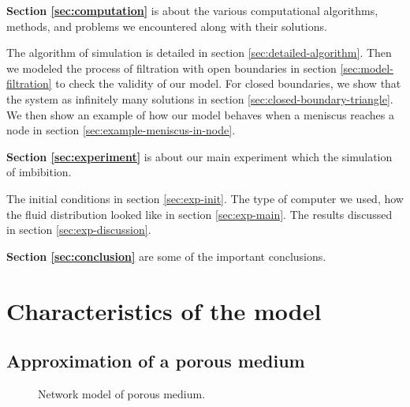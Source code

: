 \documentclass{crm-article}
\begin{document}
			\textbf{Section \ref{sec:computation}} is about the various computational algorithms, methods, and problems we encountered along with their solutions. 
			
			The algorithm of simulation is detailed in section \ref{sec:detailed-algorithm}. Then we modeled the process of filtration with open boundaries in section \ref{sec:model-filtration} to check the validity of our model. For closed boundaries, we show that the system as infinitely many solutions in section \ref{sec:closed-boundary-triangle}. We then show an example of how our model behaves when a meniscus reaches a node in section \ref{sec:example-meniscus-in-node}.
			
			\textbf{Section \ref{sec:experiment}} is about our main experiment which the simulation of imbibition.
			
			The initial conditions in section \ref{sec:exp-init}. The type of computer we used, how the fluid distribution looked like in section \ref{sec:exp-main}. The results discussed in section \ref{sec:exp-discussion}.
			
			\textbf{Section \ref{sec:conclusion}} are some of the important conclusions.
	
		
	\section{Characteristics of the model} \label{sec:model}	
		\subsection{Approximation of a porous medium} \label{sec:approx-porous-medium}

		\begin{figure}[H]
			\centering
			\caption{Network model of porous medium.}
		\end{figure}
		
\end{document}
